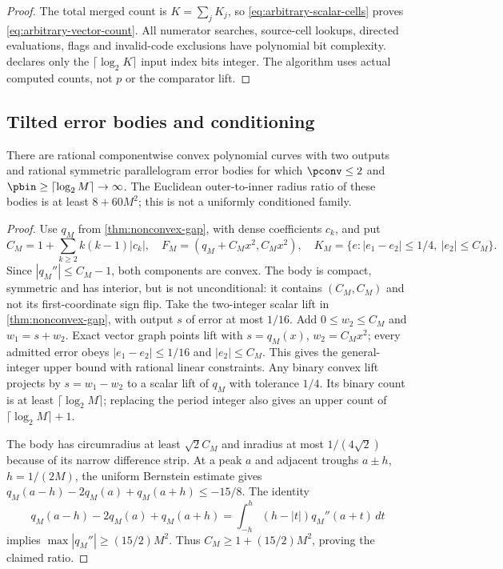 \begin{proof}
The total merged count is $K=\sum_jK_j$, so
\eqref{eq:arbitrary-scalar-cells} proves
\eqref{eq:arbitrary-vector-count}. All numerator searches, source-cell
lookups, directed evaluations, flags and invalid-code exclusions have
polynomial bit complexity.  declares only
the $\lceil\log_2K\rceil$ input index bits integer. The algorithm
uses actual computed counts, not $p$ or the comparator lift.
\end{proof}

\subsection{Tilted error bodies and conditioning}

\begin{proposition}\label{prop:tilted-gap}
There are rational componentwise convex polynomial curves with two outputs
and rational symmetric parallelogram error bodies for which
$\pconv\le2$ and $\pbin\ge\lceil\log_2M\rceil\to\infty$.
The Euclidean outer-to-inner radius ratio of these bodies is at least
$8+60M^2$; this is not a uniformly conditioned family.
\end{proposition}
\begin{proof}
Use $q_M$ from \cref{thm:nonconvex-gap}, with dense coefficients $c_k$,
and put
\[
 C_M=1+\sum_{k\ge2}k(k-1)|c_k|,\quad
 F_M=(q_M+C_Mx^2,C_Mx^2),\quad
 K_M=\{e:|e_1-e_2|\le1/4,\ |e_2|\le C_M\}.
\]
Since $|q_M''|\le C_M-1$, both components are convex. The body is
compact, symmetric and has interior, but is not unconditional: it
contains $(C_M,C_M)$ and not its first-coordinate sign flip.
Take the two-integer scalar lift in \cref{thm:nonconvex-gap}, with
output $s$ of error at most $1/16$. Add $0\le w_2\le C_M$ and
$w_1=s+w_2$. Exact vector graph points lift with
$s=q_M(x)$, $w_2=C_Mx^2$; every admitted error obeys
$|e_1-e_2|\le1/16$ and $|e_2|\le C_M$. This gives the general-integer
upper bound with rational linear constraints.
Any binary convex lift projects by $s=w_1-w_2$ to a scalar lift of
$q_M$ with tolerance $1/4$. Its binary count is at least
$\lceil\log_2M\rceil$; replacing the period integer also gives an
upper count of $\lceil\log_2M\rceil+1$.

The body has circumradius at least $\sqrt2C_M$ and inradius at most
$1/(4\sqrt2)$ because of its narrow difference strip. At a peak $a$
and adjacent troughs $a\pm h$, $h=1/(2M)$, the uniform Bernstein
estimate gives
$q_M(a-h)-2q_M(a)+q_M(a+h)\le-15/8$.
The identity
\[
 q_M(a-h)-2q_M(a)+q_M(a+h)
 =\int_{-h}^h(h-|t|)q_M''(a+t)\,dt
\]
implies $\max|q_M''|\ge(15/2)M^2$. Thus
$C_M\ge1+(15/2)M^2$, proving the claimed ratio.
\end{proof}

